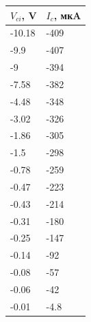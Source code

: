 \documentclass[a4paper,14pt]{article}
\begin{document}
\begin{table}[H]
	\begin{center}
		\begin{tabular}{|l|l|}
			\hline
			$V_{ci}$, V & $I_c$, мкA \\ \hline
			-10.18	&	-409 \\ \hline
			-9.9	&	-407 \\ \hline
			-9	&	-394 \\ \hline
			-7.58	&	-382 \\ \hline
			-4.48	&	-348 \\ \hline
			-3.02	&	-326 \\ \hline
			-1.86	&	-305 \\ \hline
			-1.5	&	-298 \\ \hline
			-0.78	&	-259 \\ \hline
			-0.47	&	-223 \\ \hline
			-0.43	&	-214 \\ \hline
			-0.31	&	-180 \\ \hline
			-0.25	&	-147 \\ \hline
			-0.14	&	-92 \\ \hline
			-0.08	&	-57 \\ \hline
			-0.06	&	-42 \\ \hline
			-0.01	&	-4.8 \\ \hline
		\end{tabular}
	\end{center}
\end{table}
\end{document}

